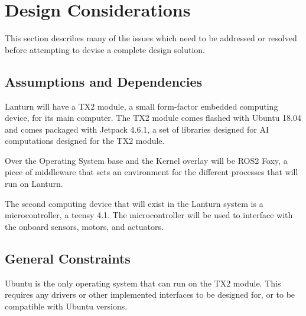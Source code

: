\section{Design Considerations}
\label{sec:design}

This section describes many of the issues which need to be addressed or
resolved before attempting to devise a complete design solution.
\par

\subsection{Assumptions and Dependencies}
\label{sec:assumptions}

Lanturn will have a TX2 module, a small form-factor embedded computing device,
for its main computer. The TX2 module comes flashed with Ubuntu 18.04 and comes
packaged with Jetpack 4.6.1, a set of libraries designed for AI computations
designed for the TX2 module.  
\par

Over the Operating System base and the Kernel overlay will be ROS2 Foxy, a
piece of middleware that sets an environment for the different processes that
will run on Lanturn. 
\par

The second computing device that will exist in the Lanturn system is a
microcontroller, a teensy 4.1. The microcontroller will be used to interface
with the onboard sensors, motors, and actuators.
\par

\subsection{General Constraints}
\label{sec:constraints}

Ubuntu is the only operating system that can run on the TX2 module. This
requires any drivers or other implemented interfaces to be designed for, or to
be compatible with Ubuntu versions. 
\par

